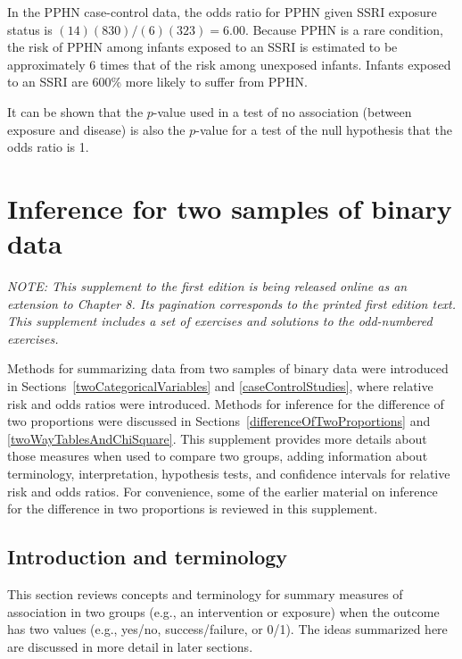 In the PPHN case-control data, the odds ratio for PPHN given SSRI exposure status is $(14)(830)/(6)(323) = 6.00$.  Because PPHN is a rare condition, the risk of PPHN among infants exposed to an SSRI is estimated to be approximately 6 times that of the risk among unexposed infants.  Infants exposed to an SSRI are 600\% more likely to suffer from PPHN.

It can be shown that the $p$-value used in a test of no association (between exposure and disease) is also the $p$-value for a test of the null hypothesis that the odds ratio is 1.


\section{Inference for two samples of binary data} \label{inferenceBinaryData}

\noindent \textit{NOTE: This supplement to the first edition is being released online as an extension to Chapter 8. Its pagination corresponds to the printed first edition text. This supplement includes a set of exercises and solutions to the odd-numbered exercises.}

\vspace{0.5cm}

Methods for summarizing data from two samples of binary data were introduced in  Sections~\ref{twoCategoricalVariables} and \ref{caseControlStudies}, where relative risk and odds ratios were introduced.  Methods for inference for the difference of two proportions were discussed in Sections~\ref{differenceOfTwoProportions} and \ref{twoWayTablesAndChiSquare}.  This supplement provides more details about those measures when used to compare two groups, adding information about terminology, interpretation, hypothesis tests, and confidence intervals for relative risk and odds ratios.  For convenience, some of the earlier material on inference for the difference in two proportions is reviewed in this supplement.


\subsection{Introduction and terminology}
\label{introAndTerminologyForRisk}

This section reviews concepts and terminology for summary measures of association in two groups (e.g., an intervention or exposure) when the outcome has two values (e.g., yes/no, success/failure, or 0/1).  The ideas summarized here are discussed in more detail in later sections.


